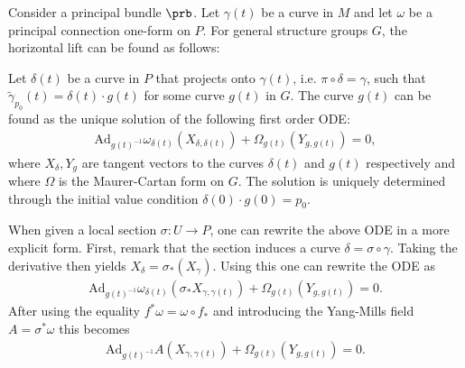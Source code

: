     \begin{method}
        Consider a principal bundle $\prb$. Let $\gamma(t)$ be a curve in $M$ and let $\omega$ be a principal connection one-form on $P$. For general structure groups $G$, the horizontal lift can be found as follows:

        \qquad Let $\delta(t)$ be a curve in $P$ that projects onto $\gamma(t)$, i.e. $\pi\circ\delta=\gamma$, such that $\widetilde\gamma_{p_0}(t)=\delta(t)\cdot g(t)$ for some curve $g(t)$ in $G$. The curve $g(t)$ can be found as the unique solution of the following first order ODE:
        \begin{gather}
            \label{diff:horizontal_ode}
            \text{Ad}_{g(t)^{-1}}\omega_{\delta(t)}(X_{\delta, \delta(t)}) + \Omega_{g(t)}(Y_{g, g(t)}) = 0,
        \end{gather}
        where $X_\delta,Y_g$ are tangent vectors to the curves $\delta(t)$ and $g(t)$ respectively and where $\Omega$ is the Maurer-Cartan form on $G$. The solution is uniquely determined through the initial value condition $\delta(0)\cdot g(0) = p_0$.
    \end{method}
    \begin{remark}
        When given a local section $\sigma:U\rightarrow P$, one can rewrite the above ODE in a more explicit form. First, remark that the section induces a curve $\delta = \sigma\circ\gamma$. Taking the derivative then yields $X_\delta = \sigma_*(X_\gamma)$. Using this one can rewrite the ODE as
        \begin{gather}
            \text{Ad}_{g(t)^{-1}}\omega_{\delta(t)}(\sigma_*X_{\gamma, \gamma(t)}) + \Omega_{g(t)}(Y_{g, g(t)}) = 0.
        \end{gather}
        After using the equality $f^*\omega = \omega\circ f_*$ and introducing the Yang-Mills field $A = \sigma^*\omega$ this becomes
        \begin{gather}
            \text{Ad}_{g(t)^{-1}}A(X_{\gamma, \gamma(t)}) + \Omega_{g(t)}(Y_{g, g(t)}) = 0.
        \end{gather}
    \end{remark}

